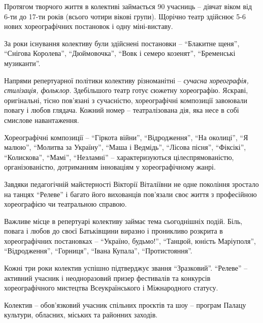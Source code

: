
Протягом творчого життя в колективі займається 90 учасниць – дівчат віком від
6-ти до 17-ти років (всього чотири вікові групи).  Щорічно театр здійснює 5-6
нових хореографічних постановок і одну міні-виставу.

За роки існування колективу були здійснені постановки – \enquote{Блакитне щеня},
\enquote{Снігова Королева}, \enquote{Дюймовочка}, \enquote{Вовк і семеро козенят}, \enquote{Бременські
музиканти}.

Напрями репертуарної політики колективу різноманітні – \emph{сучасна хореографія,
стилізація, фольклор}. Здебільшого театр готує сюжетну хореографію. Яскраві,
оригінальні, тісно пов'язані з сучасністю, хореографічні композиції завоювали
повагу і любов глядача. Кожний номер – театралізована дія, яка несе в собі
смислове навантаження.


Хореографічні композиції – \enquote{Гіркота війни}, \enquote{Відродження}, \enquote{На околиці}, \enquote{Я
малюю}, \enquote{Молитва за Україну}, \enquote{Маша і Ведмідь}, \enquote{Лісова пісня}, \enquote{Фіксікі},
\enquote{Колискова}, \enquote{Мамі}, \enquote{Незламні} – характеризуються цілеспрямованістю,
організованістю, дотриманням інноваціям у хореографічному жанрі.

Завдяки педагогічній майстерності Вікторії Віталіївни не одне покоління
зростало на танцях \enquote{Релеве} і багато його вихованців пов’язали своє життя з
професійною хореографією чи театральною справою.

Важливе місце в репертуарі колективу займає тема сьогоднішніх подій. Біль,
повага і любов до своєї Батьківщини виразно і проникливо розкрита в
хореографічних постановках – \enquote{Україно, будьмо!}, \enquote{Танцюй, юність Маріуполя},
\enquote{Відродження}, \enquote{Горниця}, \enquote{Івана Купала}, \enquote{Протистояння}.


Кожні три роки колектив успішно підтверджує звання \enquote{Зразковий}. \enquote{Релеве} –
активний учасник і неодноразовий призер фестивалів та конкурсів хореографічного
мистецтва Всеукраїнського і Міжнародного статусу.

Колектив – обов'язковий учасник спільних проєктів  та шоу – програм Палацу
культури, обласних, міських та районних заходів.

